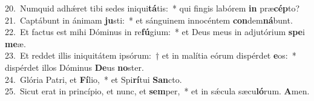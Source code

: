 {20.~}Numquid adhǽret tibi sedes iniqui\textbf{tá}tis:~* qui fingis labórem \textbf{in} præ\textbf{cép}to?\\
{21.~}Captábunt in ánimam \textbf{ju}sti:~* et sánguinem innocéntem \textbf{con}dem\textbf{ná}bunt.\\
{22.~}Et factus est mihi Dóminus in re\textbf{fú}gium:~* et Deus meus in adjutórium \textbf{spe}i \textbf{me}æ.\\
{23.~}Et reddet illis iniquitátem ipsórum:~† et in malítia eórum dispérdet \textbf{e}os:~* dispérdet illos Dóminus \textbf{De}us \textbf{no}ster.\\
{24.~}Glória Patri, et \textbf{Fí}lio,~* et Spi\textbf{rí}tui \textbf{San}cto.\\
{25.~}Sicut erat in princípio, et nunc, et \textbf{sem}per,~* et in sǽcula sæcu\textbf{ló}rum. \textbf{A}men.\\
